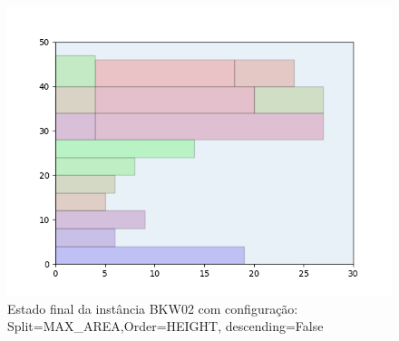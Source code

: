 \begin{figure}[H]
    \centering
    \caption[]{Estado final da instância BKW02 com configuração: Split=MAX_AREA,Order=HEIGHT, descending=False}
    \label{fig:bkw02-max_area-height-false}
    \includegraphics[scale=0.5]{output/figures/bkw/bkw02/max_area/height/false/00}
\end{figure}